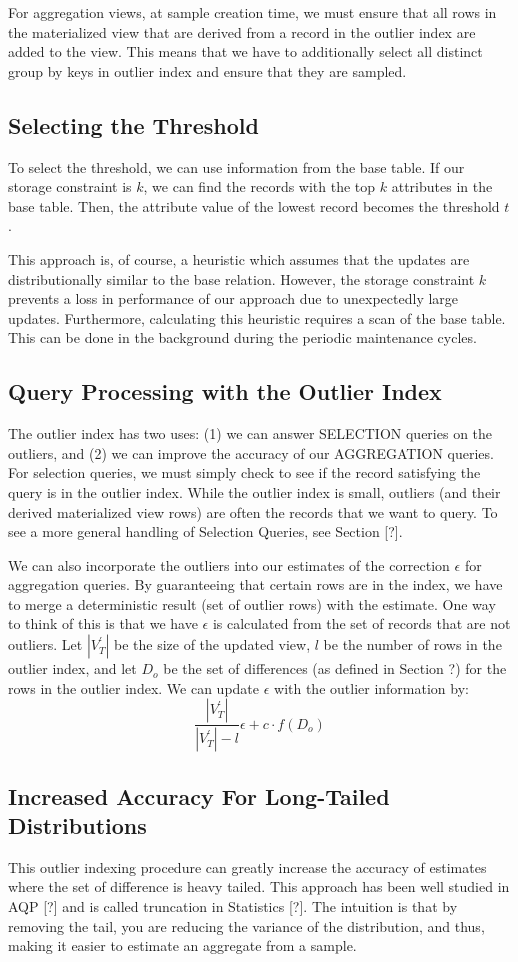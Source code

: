 For aggregation views, at sample creation time, we must ensure that all rows in the materialized view that are derived from a record in the outlier index are added to the view. 
This means that we have to additionally select all distinct group by keys in outlier index and ensure that they are sampled.

\subsection{Selecting the Threshold}
To select the threshold, we can use information from the base table.
If our storage constraint is $k$, we can find the records with the top $k$ attributes in the base table. 
Then, the attribute value of the lowest record becomes the threshold $t$.

This approach is, of course, a heuristic which assumes that the updates are distributionally similar to the 
base relation. 
However, the storage constraint $k$ prevents a loss in performance of our approach due to unexpectedly large updates.
Furthermore, calculating this heuristic requires a scan of the base table.
This can be done in the background during the periodic maintenance cycles.

\subsection{Query Processing with the Outlier Index} 
The outlier index has two uses: (1) we can answer SELECTION queries on the outliers, 
and (2) we can improve the accuracy of our AGGREGATION queries.
For selection queries, we must simply check to see if the record satisfying the query is in the outlier index.
While the outlier index is small, outliers (and their derived materialized view rows) are often the records that
we want to query.
To see a more general handling of Selection Queries, see Section [?].

We can also incorporate the outliers into our estimates of the correction
$\epsilon$ for aggregation queries. By guaranteeing that certain rows are in the index, we
have to merge a deterministic result (set of outlier rows) with the
estimate. One way to think of this is that we have $\epsilon$ is
calculated from the set of records that are not outliers. Let $|V_{T}^{'}|$
be the size of the updated view, $l$ be the number of rows in the
outlier index, and let $D_{o}$ be the set of differences (as defined
in Section ?) for the rows in the outlier index. We can update $\epsilon$
with the outlier information by:
\[
\frac{|V_{T}^{'}|}{|V_{T}^{'}|-l}\epsilon+c\cdot f(D_{o})
\]


\subsection{Increased Accuracy For Long-Tailed Distributions}
This outlier indexing procedure can greatly increase the accuracy
of estimates where the set of difference is heavy tailed. This approach
has been well studied in AQP {[}?{]} and is called truncation in Statistics
{[}?{]}. The intuition is that by removing the tail, you are reducing
the variance of the distribution, and thus, making it easier to estimate
an aggregate from a sample.